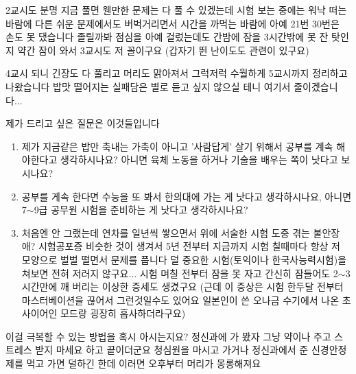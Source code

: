     2교시도 분명 지금 풀면 웬만한 문제는 다 풀 수 있겠는데 시험 보는 중에는 워낙 떠는 바람에
    다른 쉬운 문제에서도 버벅거리면서 시간을 까먹는 바람에 아예 21번 30번은 손도 못 댔습니다
    졸릴까봐 점심을 아예 걸렀는데도 간밤에 잠을 3시간밖에 못 잔 탓인지 약간 잠이 와서 3교시도 저 꼴이구요
    (갑자기 뛴 난이도도 관련이 있구요)
    \vspace{5mm}

    4교시 되니 긴장도 다 풀리고 머리도 맑아져서 그럭저럭 수월하게 5교시까지 정리하고 나왔습니다
    밥맛 떨어지는 실패담은 별로 듣고 싶지 않으실 테니 여기서 줄이겠습니다...
    \vspace{5mm}

    제가 드리고 싶은 질문은 이것들입니다
    \vspace{5mm}

    \begin{enumerate}
        \item 제가 지금같은 밥만 축내는 가축이 아니고
        '사람답게' 살기 위해서 공부를 계속 해야한다고 생각하시나요?
        아니면 육체 노동을 하거나 기술을 배우는 쪽이 낫다고 보시나요?
        \vspace{5mm}
        
        \item 공부를 게속 한다면 수능을 또 봐서 한의대에 가는 게 낫다고 생각하시나요,
        아니면 7$\sim$9급 공무원 시험을 준비하는 게 낫다고 생각하시나요?
        \vspace{5mm}
        
        \item 처음엔 안 그랬는데 연차를 일년씩 쌓으면서 위에 서술한 시험 도중 겪는 불안장애?
        시험공포증 비슷한 것이 생겨서 5년 전부터 지금까지 시험 칠때마다 항상 저 모양으로 벌벌 떨면서 문제를 풉니다
        덜 중요한 시험(토익이나 한국사능력시험)을 쳐보면 전혀 저러지 않구요...
        시험 며칠 전부터 잠을 못 자고 간신히 잠들어도 2$\sim$3시간만에 깨 버리는 이상한 증세도 생겼구요
        (근데 이 증상은 시험 한두달 전부터 마스터베이션을 끊어서 그런것일수도 있어요 일본인이 쓴 오나금 수기에서 나온 초사이어인 모드랑 굉장히 흡사하더라구요)
        \vspace{5mm}
    \end{enumerate}

    이걸 극복할 수 있는 방법을 혹시 아시는지요? 정신과에 가 봤자 그냥 약이나 주고 스트레스 받지 마세요 하고 끝이더군요
    청심원을 마시고 가거나 정신과에서 준 신경안정제를 먹고 가면 덜하긴 한데 이러면 오후부터 머리가 몽롱해져요
    \vspace{5mm}

